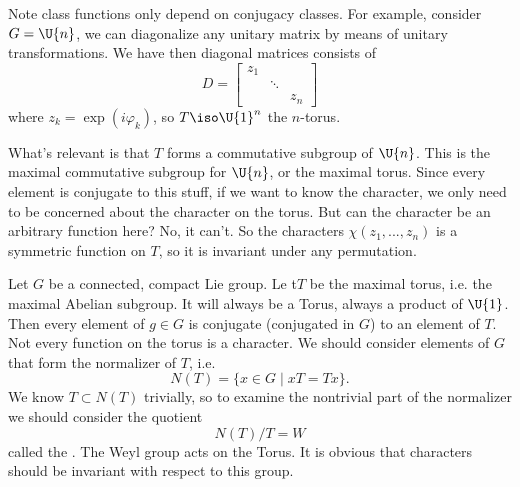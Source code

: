 Note class functions only depend on conjugacy classes. For
example, consider $G=\U{n}$, we can diagonalize any unitary
matrix by means of unitary transformations. We have then diagonal
matrices consists of
\begin{equation}
D = \begin{bmatrix}z_{1} & & \\
 & \ddots & \\
 &  & z_{n}
\end{bmatrix}
\end{equation}
where $z_{k}=\exp(i\varphi_{k})$, so $T\iso \U{1}^{n}$ the
$n$-torus.

What's relevant is that $T$ forms a commutative subgroup of
$\U{n}$. This is the maximal commutative subgroup for $\U{n}$, or
the maximal torus. Since every element is conjugate to this
stuff, if we want to know the character, we only need to be
concerned about the character on the torus. But can the character
be an arbitrary function here? No, it can't. So the characters
$\chi(z_{1},...,z_{n})$ is a symmetric function on $T$, so it is
invariant under any permutation.

Let $G$ be a connected, compact Lie group. Le t$T$ be the maximal
torus, i.e. the maximal Abelian subgroup. It will always be a
Torus, always a product of $\U{1}$. Then every element of $g\in
G$ is conjugate (conjugated in $G$) to an element of $T$. Not
every function on the torus is a character. We should consider
elements of $G$ that form the normalizer of $T$, i.e.
\begin{equation}
N(T) = \{x\in G\mid xT=Tx\}.
\end{equation}
We know $T\subset N(T)$ trivially, so to examine the nontrivial
part of the normalizer we should consider the quotient
\begin{equation}
N(T)/T = W
\end{equation}
called the . The Weyl group
acts on the Torus. It is obvious that characters should be
invariant with respect to this group.

